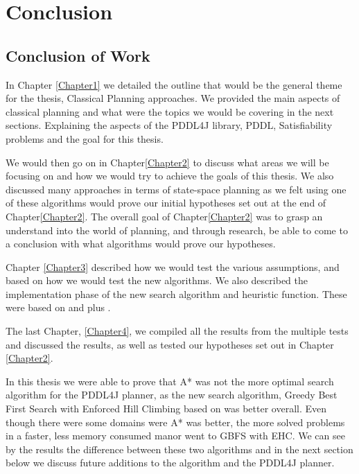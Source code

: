 \chapter{Conclusion} %

\label{Chapter5}

\section{Conclusion of Work}
In Chapter \ref{Chapter1} we detailed the outline that would be the general theme for the thesis, Classical Planning approaches. We provided the main aspects of classical planning and what were the topics we would be covering in the next sections. Explaining the aspects of the PDDL4J library, PDDL, Satisfiability problems and the goal for this thesis. 

We would then go on in Chapter\ref{Chapter2} to discuss what areas we will be focusing on and how we would try to achieve the goals of this thesis. We also discussed many approaches in terms of state-space planning as we felt using one of these algorithms would prove our initial hypotheses set out at the end of Chapter\ref{Chapter2}. The overall goal of Chapter\ref{Chapter2} was to grasp an understand into the world of planning, and through research, be able to come to a conclusion with what algorithms would prove our hypotheses. 

Chapter \ref{Chapter3} described how we would test the various assumptions, and based on \cite{Evaluation} how we would test the new algorithms. We also described the implementation phase of the new search algorithm and heuristic function. These were based on \cite{FFPlanner} and \cite{PlanningBook} plus \cite{HmHeuristic}. 

The last Chapter, \ref{Chapter4}, we compiled all the results from the multiple tests and discussed the results, as well as tested our hypotheses set out in Chapter \ref{Chapter2}.

In this thesis we were able to prove that A* was not the more optimal search algorithm for the PDDL4J planner, as the new search algorithm, Greedy Best First Search with Enforced Hill Climbing based on \cite{FFPlanner} was better overall. Even though there were some domains were A* was better, the more solved problems in a faster, less memory consumed manor went to GBFS with EHC. We can see by the results the difference between these two algorithms and in the next section below we discuss future additions to the algorithm and the PDDL4J planner. 

